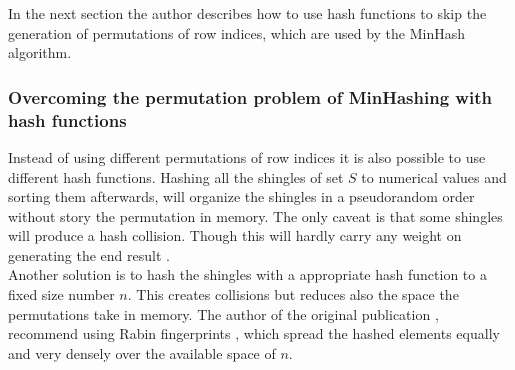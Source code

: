 In the next section the author describes how to use hash functions to skip the generation of permutations of row indices, which are used by the MinHash algorithm.\\

\subsubsection{Overcoming the permutation problem of MinHashing with hash functions} Instead of using different permutations of row indices it is also possible to use different hash functions. Hashing all the shingles of set $ S $ to numerical values and sorting them afterwards, will organize the shingles in a pseudorandom order without story the permutation in memory. The only caveat is that some shingles will produce a hash collision. Though this will hardly carry any weight on generating the end result \cite{minhash}.\\

Another solution is to hash the shingles with a appropriate hash function to a fixed size number $ n $. This creates collisions but reduces also the space the permutations take in memory. The author of the original publication \cite{minhash}, recommend using Rabin fingerprints \cite{rabinFingerprinting}, which spread the hashed elements equally and very densely over the available space of $ n $.\\